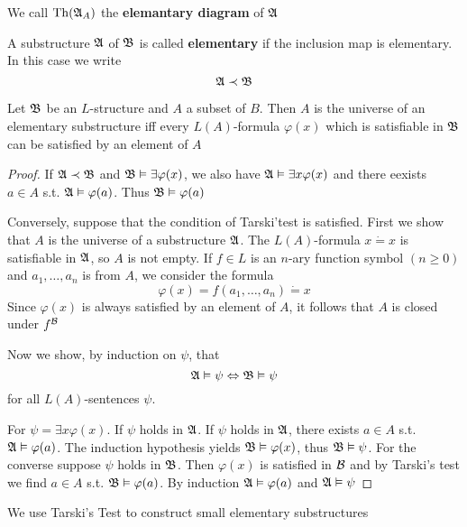 \documentclass[11pt]{article}
\begin{document}
We call \(\operatorname{Th}(\mathfrak{A}_A)\) the \textbf{elemantary diagram} of \(\mathfrak{A}\)

A substructure \(\mathfrak{A}\) of \(\mathfrak{B}\) is called \textbf{elementary} if the inclusion map
is elementary. In this case we write
\begin{equation*}
\mathfrak{A}\prec\mathfrak{B}
\end{equation*}

\begin{theorem}
\label{thm2.1.2}
Let \(\mathfrak{B}\) be an \(L\)-structure and \(A\) a subset of \(B\). Then \(A\) is
the universe of an elementary substructure iff every \(L(A)\)-formula
\(\varphi(x)\) which is satisfiable in \(\mathfrak{B}\) can be satisfied by an element of \(A\)
\end{theorem}

\begin{proof}
If \(\mathfrak{A}\prec\mathfrak{B}\) and \(\mathfrak{B}\vDash\exists\varphi(x)\), we also have \(\mathfrak{A}\vDash\exists x\varphi(x)\) and there eexists \(a\in A\)
s.t. \(\mathfrak{A}\vDash\varphi(a)\). Thus \(\mathfrak{B}\vDash\varphi(a)\)

Conversely, suppose that the condition of Tarski'test is satisfied. First we show that \(A\) is
the universe of a substructure \(\mathfrak{A}\). The \(L(A)\)-formula \(x\dot=x\) is satisfiable in \(\mathfrak{A}\),
so \(A\) is not empty. If \(f\in L\) is an \(n\)-ary function symbol \((n\ge 0)\) and \(a_1,\dots,a_n\) is
from \(A\), we consider the formula
\begin{equation*}
\varphi(x)=f(a_1,\dots,a_n)\dot=x
\end{equation*}
Since \(\varphi(x)\) is always satisfied by an element of \(A\), it follows that \(A\) is closed
under \(f^{\mathcal{B}}\)

Now we show, by induction on \(\psi\), that
\begin{equation*}
\mathfrak{A}\vDash\psi\Leftrightarrow\mathfrak{B}\vDash\psi
\end{equation*}
for all \(L(A)\)-sentences \(\psi\).

For \(\psi=\exists x\varphi(x)\). If \(\psi\) holds in \(\mathfrak{A}\). If \(\psi\) holds in \(\mathfrak{A}\), there exists \(a\in A\)
s.t. \(\mathfrak{A}\vDash\varphi(a)\). The induction hypothesis yields \(\mathfrak{B}\vDash\varphi(x)\), thus \(\mathfrak{B}\vDash\psi\). For the converse
suppose \(\psi\) holds in \(\mathfrak{B}\). Then \(\varphi(x)\) is satisfied in \(\mathcal{B}\) and by Tarski's test we
find \(a\in A\) s.t. \(\mathfrak{B}\vDash\varphi(a)\). By induction \(\mathfrak{A}\vDash\varphi(a)\) and \(\mathfrak{A}\vDash\psi\)
\end{proof}

We use Tarski's Test to construct small elementary substructures
\end{document}
